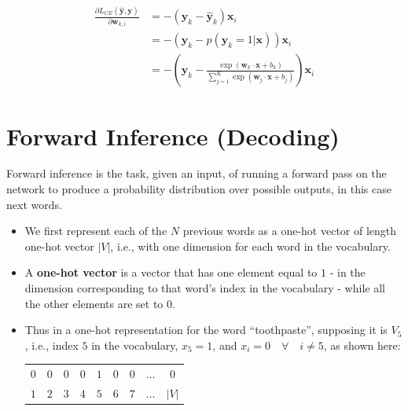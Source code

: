 \begin{align}
    \frac{\partial L_{CE}(\mathbf{\hat{y}}, \mathbf{y})}{\partial \mathbf{w}_{k,i}} 
    &= -(\mathbf{y}_{k} - \mathbf{\hat{y}}_{k})\mathbf{x}_{i}\\
    &=-(\mathbf{y}_{k} - p(\mathbf{y}_{k}=1|\mathbf{x}))\mathbf{x}_{i}\\
    &=-\left(\mathbf{y}_{k} - \displaystyle\frac{\exp(\mathbf{w}_{k}\cdot \mathbf{x} + b_{k})}{\sum_{j=1}^{K} \exp(\mathbf{w}_{j}\cdot \mathbf{x} + b_{j})}\right)\mathbf{x}_i
\end{align}

\section{Forward Inference (Decoding)}
Forward inference is the task, given an input, of running a forward pass on the network to produce a probability distribution over possible outputs, in this case next words.

\begin{itemize}
    \item We first represent each of the $N$ previous words as a one-hot vector of length one-hot vector $|V|$, i.e., with one dimension for each word in the vocabulary.
    \item A \textbf{one-hot vector}\label{one-hot vector} is a vector that has one element equal to $1$ - in the dimension corresponding to that word’s index in the vocabulary - while all the other elements are set to $0$.
    \item Thus in a one-hot representation for the word “toothpaste”, supposing it is $V_5$, i.e., index $5$ in the vocabulary, $x_5 = 1$, and $x_i = 0 \quad\forall\quad i \neq 5$, as shown here:\\
    \begin{table}[h!]
        \centering
        \begin{tabular}{c c c c c c c c c}
            $0$ & $0$ & $0$ & $0$ & $1$ & $0$ & $0$ & ... & $0$\\
            $1$ & $2$ & $3$ & $4$ & $5$ & $6$ & $7$ & ... & $|V|$
        \end{tabular}
    \end{table}
\end{itemize}

